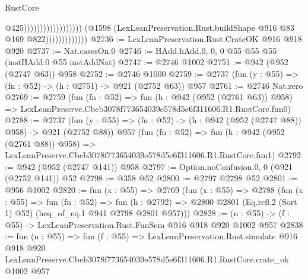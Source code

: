 \begin{lexlean}{RustCore}
\begin{coremodule}
                                                              @425))))))))))))))))))
                          (@1598
                            (LexLeanPreservation.Rust.buildShape @916 @83 @169 @822)))))))))))))
@2736 := LexLeanPreservation.Rust.CrateOK @916 @918 @920
@2737 := Nat.casesOn.{0}
@2746 := HAdd.hAdd.{0, 0, 0} @55 @55 @55 (instHAdd.{0} @55 instAddNat)
@2747 := @2746 @1002
@2751 := @942 (@952 (@2747 @63)) @958
@2752 := @2746 @1000
@2759 := @2737 (fun (y : @55) => (fn : @52) -> (h : @2751) -> @921 (@2752 @63)) @957
@2761 := @2746 Nat.zero
@2769 := @2759
    (fun (fn : @52) =>
    fun (h : @942 (@952 (@2761 @63)) @958) =>
    LexLeanPreserve.Cbeb3078f773654039e578d5e6f311606.R1.RustCore.fun0)
@2788 := @2737
    (fun (y : @55) => (fn : @52) -> (h : @942 (@952 (@2747 @88)) @958) -> @921 (@2752 @88))
    @957
    (fun (fn : @52) =>
    fun (h : @942 (@952 (@2761 @88)) @958) =>
    LexLeanPreserve.Cbeb3078f773654039e578d5e6f311606.R1.RustCore.fun1)
@2792 := @942 (@952 (@2747 @141)) @958
@2797 := Option.noConfusion.{0, 0} (@921 (@2752 @141)) @52
@2798 := @358 @52
@2800 := @2797 @2798 @52
@2801 := @956 @1002
@2820 := fun (x : @55) =>
  @2769
    (fun (x : @55) =>
    @2788
      (fun (x : @55) =>
      fun (fn : @52) =>
      fun (h : @2792) =>
      @2800 @2801 (Eq.refl.{2} (Sort 1) @52) (heq_of_eq.{1} @941 @2798 @2801 @957)))
@2828 := (n : @55) -> (f : @55) -> LexLeanPreservation.Rust.FunSem @916 @918 @920 @1002 @957
@2838 := fun (n : @55) =>
  fun (f : @55) =>
  LexLeanPreservation.Rust.simulate
    @916
    @918
    @920
    LexLeanPreserve.Cbeb3078f773654039e578d5e6f311606.R1.RustCore.crate_ok
    @1002
    @957
\end{coremodule}
\end{lexlean}

